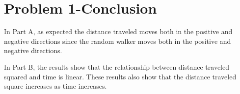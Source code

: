 \documentclass[12pt]{article}
\begin{document}
	
\section{Problem 1-Conclusion}


In Part A, as expected the distance traveled moves both in the positive and negative directions since the random walker moves both in the positive and negative directions.

In Part B, the results show that the relationship between distance traveled squared and time is linear. These results also show that the distance traveled square increases as time increases.
\end{document}
